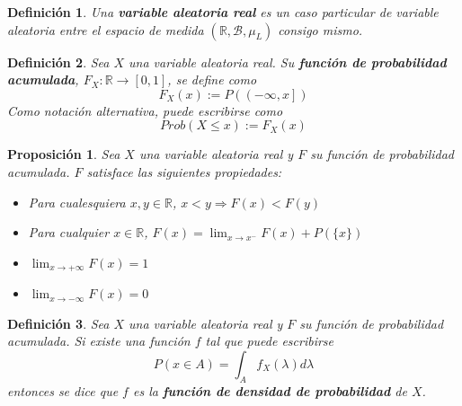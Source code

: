 \documentclass[12pt,letterpaper]{book}
\newtheorem{definicion}{Definición}[chapter]
\newtheorem{proposicion}[teorema]{Proposición}
\newcommand{\R}{\mathbb{R}}
\begin{document}
\begin{definicion}
Una \textbf{variable aleatoria real} es un caso particular de variable aleatoria entre el espacio de medida $(\R,\mathcal{B},\mu_L)$ consigo mismo.
\end{definicion}


\begin{definicion}%
Sea $X$ una variable aleatoria real. Su \textbf{función de probabilidad acumulada}, $F_X : \R \rightarrow [0,1]$, se define como
\begin{equation*}
F_X (x) := P\left( \left(-\infty,x \right] \right)
\end{equation*}
Como notación alternativa, puede escribirse como
\begin{equation}
Prob(X\leq x) := F_X(x) 
\end{equation}
\end{definicion}

\begin{proposicion}
Sea $X$ una variable aleatoria real y $F$ su función de probabilidad acumulada. $F$ satisface las siguientes propiedades:
\begin{itemize}
\item Para cualesquiera $x,y\in \R$, $x < y \Rightarrow F(x) < F(y)$
\item Para cualquier $x\in\R$, $F(x) = \lim_{x\rightarrow x^{-}} F(x) + P(\{x\})$
\item $\lim_{x\rightarrow +\infty} F(x) = 1$
\item $\lim_{x\rightarrow -\infty} F(x) = 0$
\end{itemize}
\end{proposicion}

\begin{definicion}
Sea $X$ una variable aleatoria real y $F$ su función de probabilidad acumulada. Si existe una función $f$  tal que puede escribirse
\begin{equation}
P(x\in A) = \int_A f_X(\lambda) d\lambda 
\end{equation}
entonces se dice que $f$ es la \textbf{función de densidad de probabilidad} de $X$.
\end{definicion}
\end{document}
